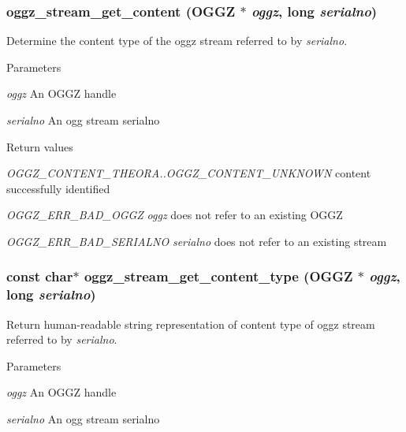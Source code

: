 \subsubsection[{oggz\_\-stream\_\-get\_\-content}]{ oggz\_\-stream\_\-get\_\-content ({\bf OGGZ} $\ast$ {\em oggz}, \/  long {\em serialno})}\label{oggz__read_8h_a1cd43b28f34bf82dc1830cc517b19e14}


Determine the content type of the oggz stream referred to by {\itshape serialno\/}. 


\begin{DoxyParams}{Parameters}
\item[{\em oggz}]An OGGZ handle \item[{\em serialno}]An ogg stream serialno \end{DoxyParams}

\begin{DoxyRetVals}{Return values}
\item[{\em OGGZ\_\-CONTENT\_\-THEORA..OGGZ\_\-CONTENT\_\-UNKNOWN}]content successfully identified \item[{\em OGGZ\_\-ERR\_\-BAD\_\-OGGZ}]{\itshape oggz\/} does not refer to an existing OGGZ \item[{\em OGGZ\_\-ERR\_\-BAD\_\-SERIALNO}]{\itshape serialno\/} does not refer to an existing stream \end{DoxyRetVals}
\subsubsection[{oggz\_\-stream\_\-get\_\-content\_\-type}]{\setlength{\rightskip}{0pt plus 5cm}const char$\ast$ oggz\_\-stream\_\-get\_\-content\_\-type ({\bf OGGZ} $\ast$ {\em oggz}, \/  long {\em serialno})}\label{oggz__read_8h_a85665d758dbc159bc48055bf3f572b37}


Return human-\/readable string representation of content type of oggz stream referred to by {\itshape serialno\/}. 


\begin{DoxyParams}{Parameters}
\item[{\em oggz}]An OGGZ handle \item[{\em serialno}]An ogg stream serialno \end{DoxyParams}

